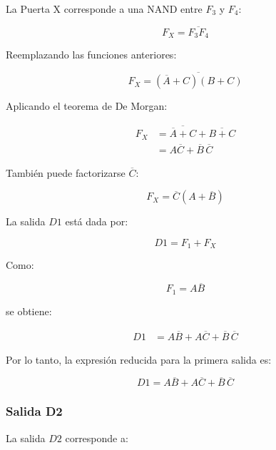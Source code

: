 \documentclass[12pt]{report}
\begin{document}
La Puerta X corresponde a una NAND entre $F_3$ y $F_4$:

\begin{equation}
    F_X = \overline{F_3F_4}
\end{equation}

Reemplazando las funciones anteriores:

\begin{equation}
    F_X =
    \overline{
        (\overline{A}+C)(B+C)
    }
\end{equation}

Aplicando el teorema de De Morgan:

\begin{align}
    F_X
    &=
    \overline{\overline{A}+C}
    +
    \overline{B+C} \\
    &=
    A\overline{C}
    +
    \overline{B}\,\overline{C}
\end{align}

También puede factorizarse $\overline{C}$:

\begin{equation}
    F_X =
    \overline{C}(A+\overline{B})
\end{equation}

La salida $D1$ está dada por:

\begin{equation}
    D1 = F_1 + F_X
\end{equation}

Como:

\begin{equation}
    F_1 = A\overline{B}
\end{equation}

se obtiene:

\begin{align}
    D1
    &= A\overline{B}
    + A\overline{C}
    + \overline{B}\,\overline{C}
\end{align}

Por lo tanto, la expresión reducida para la primera salida es:

\begin{equation}
    \boxed{
    D1 =
    A\overline{B}
    + A\overline{C}
    + \overline{B}\,\overline{C}
    }
\end{equation}


\subsubsection{Salida D2}

La salida $D2$ corresponde a:
\end{document}
